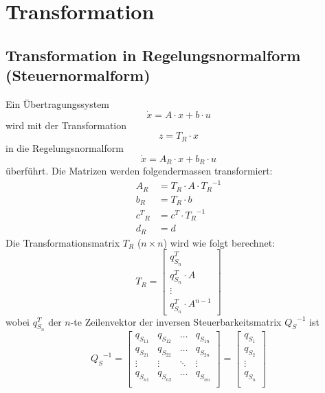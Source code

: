 



\section{Transformation}
\subsection{Transformation in Regelungsnormalform (Steuernormalform)}
Ein Übertragungssystem 
\[ \dot{x}=A\cdot x +  b \cdot u \]
wird mit der Transformation
\[ z=T_R\cdot x \]
in die Regelungsnormalform
\[ \dot{x}=A_R\cdot x +  b_R \cdot u \]
überführt. Die Matrizen werden folgendermassen transformiert:
\[\begin{aligned}
	A_R &= T_R\cdot A \cdot {T_R}^{-1}	\\
	b_R &= T_R\cdot b	\\	
	{c^T}_R &= c^T\cdot {T_R}^{-1}	\\	
	d_R &= d
\end{aligned}\]
Die Transformationsmatrix $T_R$ ($n\times n$) wird wie folgt berechnet:
\[ \renewcommand\arraystretch{1.3}
	T_R= \begin{bmatrix}
		q_{S_n}^T \\
		q_{S_n}^T \cdot A \\
		\vdots \\
		q_{S_n}^T \cdot A^{n-1}	
	\end{bmatrix}
\]
wobei $q_{S_n}^T$ der $n$-te Zeilenvektor der inversen Steuerbarkeitsmatrix ${Q_S}^{-1}$ ist
\[
	{Q_S}^{-1} = \begin{bmatrix}
		q_{S_{11}} & q_{S_{12}} & \ldots & q_{S_{1n}}\\
		q_{S_{21}} & q_{S_{22}} & \ldots & q_{S_{2n}}\\
		\vdots		& \vdots	 & \ddots & \vdots\\
		q_{S_{n1}} & q_{S_{n2}} & \ldots & q_{S_{nn}}\\	 
	\end{bmatrix} =
	\begin{bmatrix}
		q_{S_1} \\
		q_{S_2} \\
		\vdots \\
		q_{S_n} \\
	\end{bmatrix}	
\]

